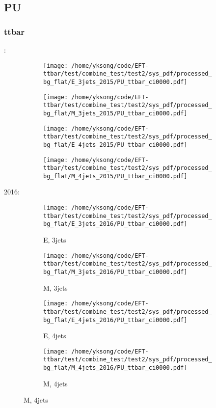 \documentclass{beamer}
\begin{document}
\subsection{PU}

\begin{frame}
\frametitle{ttbar}
\fontsize{5}{1}:
\begin{figure}
\centering
\begin{subfigure}[b]{0.24\textwidth}
\texttt{[image: /home/yksong/code/EFT-ttbar/test/combine\_test/test2/sys\_pdf/processed\_bg\_flat/E\_3jets\_2015/PU\_ttbar\_ci0000.pdf]}
\end{subfigure}
\begin{subfigure}[b]{0.24\textwidth}
\texttt{[image: /home/yksong/code/EFT-ttbar/test/combine\_test/test2/sys\_pdf/processed\_bg\_flat/M\_3jets\_2015/PU\_ttbar\_ci0000.pdf]}
\end{subfigure}
\begin{subfigure}[b]{0.24\textwidth}
\texttt{[image: /home/yksong/code/EFT-ttbar/test/combine\_test/test2/sys\_pdf/processed\_bg\_flat/E\_4jets\_2015/PU\_ttbar\_ci0000.pdf]}
\end{subfigure}
\begin{subfigure}[b]{0.24\textwidth}
\texttt{[image: /home/yksong/code/EFT-ttbar/test/combine\_test/test2/sys\_pdf/processed\_bg\_flat/M\_4jets\_2015/PU\_ttbar\_ci0000.pdf]}
\end{subfigure}
\end{figure}
2016:
\begin{figure}
\centering
\begin{subfigure}[b]{0.24\textwidth}
\texttt{[image: /home/yksong/code/EFT-ttbar/test/combine\_test/test2/sys\_pdf/processed\_bg\_flat/E\_3jets\_2016/PU\_ttbar\_ci0000.pdf]}
\captionsetup{font=tiny}
\caption{E, 3jets}
\end{subfigure}
\begin{subfigure}[b]{0.24\textwidth}
\texttt{[image: /home/yksong/code/EFT-ttbar/test/combine\_test/test2/sys\_pdf/processed\_bg\_flat/M\_3jets\_2016/PU\_ttbar\_ci0000.pdf]}
\captionsetup{font=tiny}
\caption{M, 3jets}
\end{subfigure}
\begin{subfigure}[b]{0.24\textwidth}
\texttt{[image: /home/yksong/code/EFT-ttbar/test/combine\_test/test2/sys\_pdf/processed\_bg\_flat/E\_4jets\_2016/PU\_ttbar\_ci0000.pdf]}
\captionsetup{font=tiny}
\caption{E, 4jets}
\end{subfigure}
\begin{subfigure}[b]{0.24\textwidth}
\texttt{[image: /home/yksong/code/EFT-ttbar/test/combine\_test/test2/sys\_pdf/processed\_bg\_flat/M\_4jets\_2016/PU\_ttbar\_ci0000.pdf]}
\captionsetup{font=tiny}
\caption{M, 4jets}
\end{subfigure}
\end{figure}
\end{frame}
\end{document}
